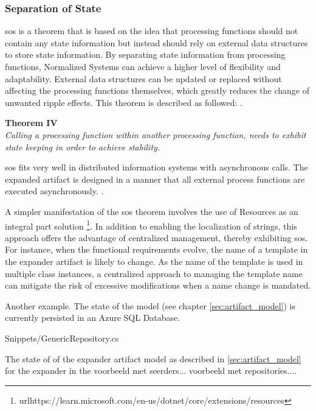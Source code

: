 \subsubsection{Separation of State}

\gls{sos} is a theorem that is based on the idea that processing functions should not
contain any state information but instead should rely on external data structures to store
state information. By separating state information from processing functions, Normalized
Systems can achieve a higher level of flexibility and adaptability. External data
structures can be updated or replaced without affecting the processing functions
themselves, which greatly reduces the change of unwanted ripple effects. This theorem is
described as followed: \parencite[258]{mannaert_normalized_2016}.

\begin{center}
    \textbf{Theorem IV}\\
    \textit{Calling a processing function within another processing function, needs to exhibit state keeping in order to achieve stability.}
\end{center}

\gls{sos} fits very well in distributed information systems with asynchronous calls. The
expanded artifact is designed in a manner that all external process functions are executed
asynchronously. .

A simpler manifestation of the \gls{sos} theorem involves the use of Resources as an
integral part solution
\footnote{url{https://learn.microsoft.com/en-us/dotnet/core/extensions/resources}}. In
addition to enabling the localization of strings, this approach offers the advantage of
centralized management, thereby exhibiting \gls{sos}. For instance, when the functional
requirements evolve, the name of a template in the expander artifact is likely to change.
As the name of the template is used in multiple class instances, a centralized approach to
managing the template name can mitigate the risk of excessive modifications when a name
change is mandated.

Another example. The state of the model (see chapter \ref{sec:artifact_model}) is
currently persisted in an Azure SQL Database.


    {Snippets/GenericRepository.cs}

The state of of the expander artifact model as described in \ref{sec:artifact_model} for the expander in the 
voorbeeld met seerders...
voorbeeld met repositories....